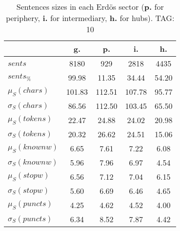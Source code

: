 \begin{table}[h!]
\begin{center}
\begin{tabular}{| l || c | c | c | c |}\hline
 & {\bf g.} & {\bf p.} & {\bf i.} & {\bf h.} \\\hline\hline
$sents$ & 8180  & 929  & 2818  & 4435 \\
$sents_{\%}$ & 99.98  & 11.35  & 34.44  & 54.20 \\\hline
$\mu_S(chars)$ & 101.83  & 112.51  & 107.78  & 95.77 \\
$\sigma_S(chars)$ & 86.56  & 112.50  & 103.45  & 65.50 \\\hline
$\mu_S(tokens)$ & 22.47  & 24.88  & 24.02  & 20.98 \\
$\sigma_S(tokens)$ & 20.32  & 26.62  & 24.51  & 15.06 \\\hline
$\mu_S(knownw)$ & 6.65  & 7.61  & 7.22  & 6.08 \\
$\sigma_S(knownw)$ & 5.96  & 7.96  & 6.97  & 4.54 \\\hline
$\mu_S(stopw)$ & 6.56  & 7.12  & 7.04  & 6.15 \\
$\sigma_S(stopw)$ & 5.60  & 6.69  & 6.46  & 4.65 \\\hline
$\mu_S(puncts)$ & 4.25  & 4.62  & 4.52  & 4.00 \\
$\sigma_S(puncts)$ & 6.34  & 8.52  & 7.87  & 4.42 \\\hline
\end{tabular}
\caption{Sentences sizes in each Erd\"os sector ({{\bf p.}} for periphery, {{\bf i.}} for intermediary, {{\bf h.}} for hubs). TAG: 10}
\end{center}
\end{table}